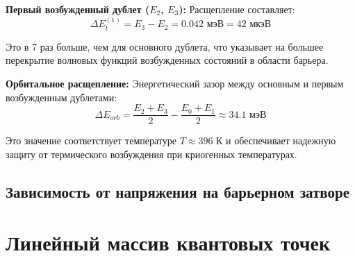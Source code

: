 \documentclass[a4paper,14pt]{extreport} %
\begin{document}
\textbf{Первый возбужденный дублет ($E_2$, $E_3$):}
Расщепление составляет:
\begin{equation}
    \Delta E_t^{(1)} = E_3 - E_2 = 0.042 \text{ мэВ} = 42 \text{ мкэВ}
\end{equation}

Это в 7 раз больше, чем для основного дублета, что указывает на большее перекрытие волновых функций возбужденных состояний в области барьера.

\textbf{Орбитальное расщепление:}
Энергетический зазор между основным и первым возбужденным дублетами:
\begin{equation}
    \Delta E_{orb} = \frac{E_2 + E_3}{2} - \frac{E_0 + E_1}{2} \approx 34.1 \text{ мэВ}
\end{equation}

Это значение соответствует температуре $T \approx 396$ К и обеспечивает надежную защиту от термического возбуждения при криогенных температурах.

\subsection{Зависимость от напряжения на барьерном затворе}






\section{Линейный массив квантовых точек}
\end{document}
